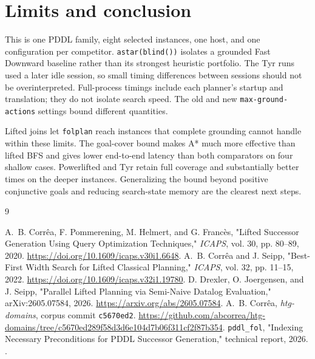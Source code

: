 \documentclass[10pt,a4paper]{article}
\begin{document}
\section{Limits and conclusion}
This is one PDDL family, eight selected instances, one host, and one
configuration per competitor. \texttt{astar(blind())} isolates a grounded
Fast Downward baseline rather than its strongest heuristic portfolio.
The Tyr runs used a later idle session, so small timing differences between
sessions should not be overinterpreted. Full-process timings include each
planner's startup and translation; they do not isolate search speed. The old
and new \texttt{max-ground-actions} settings bound different quantities.

Lifted joins let \texttt{folplan} reach instances that complete grounding
cannot handle within these limits. The goal-cover bound makes A* much more
effective than lifted BFS and gives lower end-to-end latency than both
comparators on four shallow cases. Powerlifted and Tyr retain full coverage
and substantially better times on the deeper instances. Generalizing the
bound beyond positive conjunctive goals and reducing search-state memory
are the clearest next steps.

\small
\begin{thebibliography}{9}
\raggedright
{}
A.~B. Corr\^ea, F. Pommerening, M. Helmert, and G. Franc\`es,
"Lifted Successor Generation Using Query Optimization Techniques,"
\emph{ICAPS}, vol. 30, pp. 80--89, 2020.
\url{https://doi.org/10.1609/icaps.v30i1.6648}.
A.~B. Corr\^ea and J. Seipp,
"Best-First Width Search for Lifted Classical Planning,"
\emph{ICAPS}, vol. 32, pp. 11--15, 2022.
\url{https://doi.org/10.1609/icaps.v32i1.19780}.
D. Drexler, O. Joergensen, and J. Seipp,
"Parallel Lifted Planning via Semi-Naive Datalog Evaluation,"
arXiv:2605.07584, 2026. \url{https://arxiv.org/abs/2605.07584}.
A.~B. Corr\^ea, \emph{htg-domains}, corpus commit \texttt{c5670ed2}.
\url{https://github.com/abcorrea/htg-domains/tree/c5670ed289f58d3d6e104d7b06f311cf2f87b354}.
\texttt{pddl\_fol}, "Indexing Necessary Preconditions for PDDL
Successor Generation," technical report, 2026.
.
\end{thebibliography}
\end{document}
